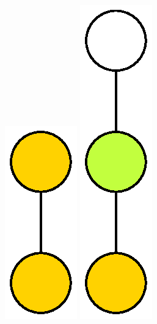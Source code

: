 \documentclass{mcom-l}
\begin{document}
\begin{figure}[H]

\centering
\hfill\includegraphics[scale=0.9]{Thesis/images/Coloured3_1LatticeGraph.eps}\hfill
\includegraphics[scale=0.6]{Thesis/images/Coloured28_3LatticeGraph.eps}\hfill

\end{figure}
\end{document}

